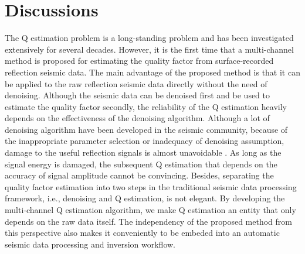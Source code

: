 

\section{Discussions}
The Q estimation problem is a long-standing problem and has been investigated extensively for several decades. However, it is the first time that a multi-channel method is proposed for estimating the quality factor from surface-recorded reflection seismic data. The main advantage of the proposed method is that it can be applied to the raw reflection seismic data directly without the need of denoising. Although the seismic data can be denoised first and be used to estimate the quality factor secondly, the reliability of the Q estimation heavily depends on the effectiveness of the denoising algorithm. Although a lot of denoising algorithm have been developed in the seismic community, because of the inappropriate parameter selection or inadequacy of denoising assumption, damage to the useful reflection signals is almost unavoidable \cite[]{yangkang2015ortho}. As long as the signal energy is damaged, the subsequent Q estimation that depends on the accuracy of signal amplitude cannot be convincing. Besides, separating the quality factor estimation into two steps in the traditional seismic data processing framework, i.e., denoising and Q estimation, is not elegant. By developing the multi-channel Q estimation algorithm, we make Q estimation an entity that only depends on the raw data itself. The independency of the proposed method from this perspective also makes it conveniently to be embeded into an automatic seismic data processing and inversion workflow. 

